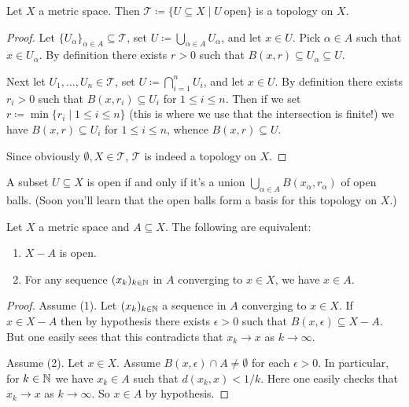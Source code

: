 \begin{proposition}
  Let $X$ a metric space. Then $\mathcal{T} \coloneqq \{U \subseteq X
  \mid U\ \text{open}\}$ is a topology on $X$.
\end{proposition}

\begin{proof}
  Let $\{U_\alpha\}_{\alpha \in A} \subseteq \mathcal{T}$, set $U
  \coloneqq \bigcup_{\alpha \in A} U_\alpha$, and let $x \in U$. Pick
  $\alpha \in A$ such that $x \in U_\alpha$. By definition there
  exists $r > 0$ such that $B(x,r) \subseteq U_\alpha \subseteq U$.

  Next let $U_1,\ldots,U_n \in \mathcal{T}$, set $U \coloneqq
  \bigcap_{i=1}^n U_i$, and let $x \in U$. By definition there exists
  $r_i > 0$ such that $B(x,r_i) \subseteq U_i$ for $1 \le i \le
  n$. Then if we set $r \coloneqq \min \{r_i \mid 1 \le i \le n\}$
  (this is where we use that the intersection is finite!) we have
  $B(x,r) \subseteq U_i$ for $1 \le i \le n$, whence $B(x,r) \subseteq
  U$.

  Since obviously $\emptyset, X \in \mathcal{T}$, $\mathcal{T}$ is
  indeed a topology on $X$.
\end{proof}

\begin{exercise}
  \label{unionofballs}
  A subset $U \subseteq X$ is open if and only if it's a union
  $\bigcup_{\alpha \in A} B(x_\alpha, r_\alpha)$ of open balls. (Soon
  you'll learn that the open balls form a \textup{basis} for this
  topology on $X$.)
\end{exercise}

\begin{proposition}
  Let $X$ a metric space and $A \subseteq X$. The following are
  equivalent:
  \begin{enumerate}
  \item $X - A$ is open.
  \item For any sequence $(x_k)_{k \in \mathbb{N}}$ in $A$ converging to $x
    \in X$, we have $x \in A$.
  \end{enumerate}
\end{proposition}

\begin{proof}
  Assume (1). Let $(x_k)_{k \in \mathbb{N}}$ a sequence in $A$ converging to
  $x \in X$. If $x \in X - A$ then by hypothesis there exists
  $\epsilon > 0$ such that $B(x, \epsilon) \subseteq X - A$. But one
  easily sees that this contradicts that $x_k \to x$ as $k \to
  \infty$.

  Assume (2). Let $x \in X$. Assume $B(x,\epsilon) \cap A \ne
  \emptyset$ for each $\epsilon > 0$. In particular, for $k \in \mathbb{N}$ we
  have $x_k \in A$ such that $d(x_k,x) < 1/k$. Here one easily checks
  that $x_k \to x$ as $k \to \infty$. So $x \in A$ by hypothesis.
\end{proof}

